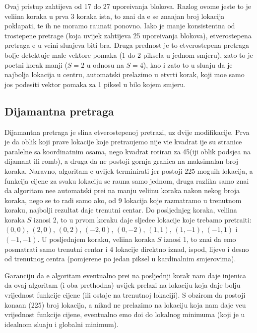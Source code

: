 Ovaj pristup zahtijeva od 17 do 27 upore\dj ivanja blokova. Razlog ovome jeste \sh to je veli\ch ina koraka u prva 3 koraka ista, \sh to zna\ch i da \cj e se zna\ch ajan broj lokacija poklapati, te ih ne moramo ra\ch unati ponovno.
Iako je manje konsistentna od trostepene pretrage (koja uvijek zahtijeva 25 upore\dj ivanja blokova), \ch etverostepena pretraga \cj e u ve\cj ini slu\ch ajeva biti br\zh a. Druga prednost je \sh to \ch etverostepena pretraga bolje
detektuje male vektore pomaka (1 do 2 piksela u jednom smjeru), zato \sh to je po\ch etni korak manji ($S=2$ u odnosu na $S=4$), kao i zato \sh to u slu\ch aju da je najbolja lokacija u centru, automatski prelazimo u \ch etvrti korak,
koji mo\zh e samo jos podesiti vektor pomaka za 1 piksel u bilo kojem smjeru.

\subsection{Dijamantna pretraga}
Dijamantna pretraga je sli\ch na \ch etverostepenoj pretrazi, uz dvije modifikacije. Prva je da oblik koji prave lokacije koje pretra\zh ujemo nije vi\sh e kvadrat \ch ije su stranice paralelne sa koordinatnim osama, nego kvadrat 
rotiran za 45\degree (\ch iji oblik podsje\cj a na dijamant ili romb), a druga da ne postoji gornja granica na maksimalan broj koraka. Naravno, algoritam \cj e uvijek terminirati jer postoji 225 mogu\cj ih lokacija, a funkcija cijene 
za svaku lokaciju se ra\ch una samo jednom,
druga razlika samo zna\ch i da algoritam ne\cj e automatski pre\cj i na manju veli\ch inu koraka nakon nekog broja koraka, nego se to radi samo ako, od 9 lokacija koje razmatramo u trenutnom koraku, najbolji rezultat daje
trenutni centar. Do posljednjeg koraka, veli\ch ina koraka $S$ iznosi 2, \sh to u prvom koraku daje sljede\cj e lokacije koje trebamo pretra\zh iti: $(0, 0)$, $(2, 0)$, $(0, 2)$, $(-2, 0)$, $(0, -2)$, $(1, 1)$, $(1, -1)$, $(-1, 1)$ i $(-1, -1)$.
U posljednjem koraku, veli\ch ina koraka $S$ iznosi 1, \sh to zna\ch i da \cj emo posmatrati samo trenutni centar i 4 lokacije direktno iznad, ispod, lijevo i desno od trenutnog centra (pomjerene po jedan piksel u kardinalnim
smjerovima).

Garanciju da \cj e algoritam eventualno pre\cj i na posljednji korak nam daje \ch injenica da ovaj algoritam (i oba prethodna) uvijek prelazi na lokaciju koja daje bolju vrijednost funkcije cijene (ili ostaje na trenutnoj lokaciji). 
S obzirom da postoji kona\ch an (225) broj lokacija, a nikad ne prelazimo na lokaciju koja nam daje ve\cj u vrijednost funkcije cijene, eventualno \cj emo do\cj i do lokalnog minimuma (koji je u idealnom slu\ch aju i globalni
minimum).

